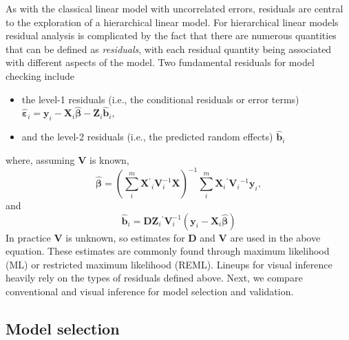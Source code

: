 \documentclass{article} %
\newcommand{\inv}{\ensuremath{^{-1}}}
\newcommand{\trans}{\ensuremath{^\prime}}
\begin{document}
As with the classical linear model with uncorrelated errors, residuals are central to the exploration of a hierarchical linear model. For hierarchical linear models residual analysis is complicated by the fact that there are numerous quantities that can be defined as \emph{residuals}, with each residual quantity being associated with different aspects of the model. Two fundamental residuals for model checking include
%
\begin{itemize}
\item the level-1 residuals (i.e., the conditional residuals or error terms) $\widehat{\bm{\varepsilon}}_i = \bm{y}_i - \bm{X}_i \widehat{\bm{\beta}} - \bm{Z}_i \widehat{\bm{b}}_i$,

\item and the level-2 residuals (i.e., the predicted random effects) $\widehat{\bm{b}}_i$
\end{itemize}
%
where, assuming $\bm{V}$ is known,
\begin{equation}\label{eq:glsb}
	\widehat{\bm{\beta}} = 
	\left(\sum^m_i \bm{X}\trans_i \bm{V}^{-1}_i \bm{X} \right)^{-1} 
	\sum^m_i \bm{X}_i\trans \bm{V}_i\inv \bm{y}_i,
\end{equation}
and
\begin{equation}\label{eq:eb}
	\widehat{\bm{b}}_i = \bm{D} \bm{Z}_i\trans \bm{V}_i^{-1} 
	\left(\bm{y}_i - \bm{X}_i \widehat{\bm{\beta}} \right)
\end{equation}
%
In practice $\bm{V}$ is unknown, so estimates for $\bm{D}$ and $\bm{V}$ are used in the above equation. These estimates are commonly found through maximum likelihood (ML) or restricted maximum likelihood (REML). Lineups for visual inference heavily rely on the types of residuals defined above. Next, we compare conventional and visual inference for model selection and validation.


\subsection{Model selection}

\end{document}
